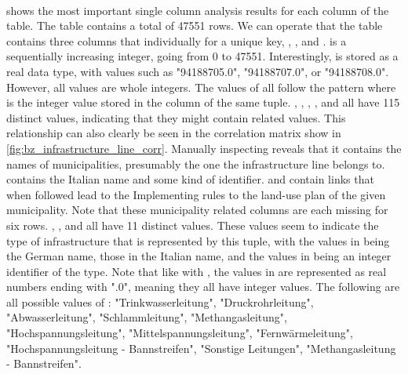 \paragraph{}
 shows the most important single column analysis results for each column of the  table. The table contains a total of 47551 rows. We can operate that the table contains three columns that individually for a unique key, , , and .  is a sequentially increasing integer, going from 0 to 47551. Interestingly,  is stored as a real data type, with values such as "94188705.0", "94188707.0", or "94188708.0". However, all values are whole integers. The values of  all follow the pattern  where  is the integer value stored in the  column of the same tuple.
, , , , and  all have 115 distinct values, indicating that they might contain related values. This relationship can also clearly be seen in the correlation matrix show in \cref{fig:bz_infrastructure_line_corr}. Manually inspecting  reveals that it contains the names of municipalities, presumably the one the infrastructure line belongs to.  contains the Italian name and  some kind of identifier.  and  contain links that when followed lead to the Implementing rules to the land-use plan of the given municipality. Note that these municipality related columns are each missing for six rows.
, , and  all have 11 distinct values. These values seem to indicate the type of infrastructure that is represented by this tuple, with the values in  being the German name, those in  the Italian name, and the values in  being an integer identifier of the type. Note that like with , the values in  are represented as real numbers ending with ".0", meaning they all have integer values. The following are all possible values of : "Trinkwasserleitung", "Druckrohrleitung", "Abwasserleitung", "Schlammleitung", "Methangasleitung", "Hochspannungsleitung", "Mittelspannungsleitung", "Fernwärmeleitung", "Hochspannungsleitung - Bannstreifen", "Sonstige Leitungen", "Methangasleitung - Bannstreifen".

